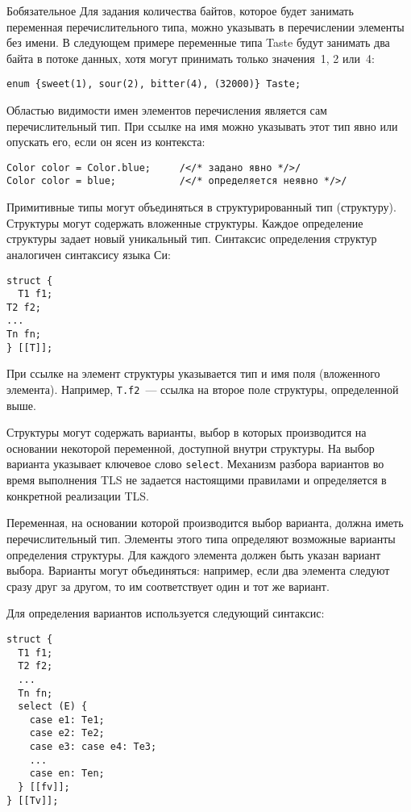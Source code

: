 \begin{appendix}{Б}{обязательное}
Для задания количества байтов, которое будет занимать переменная 
перечислительного типа, можно указывать в перечислении элементы без имени. 
В следующем примере переменные типа Taste будут занимать два байта в 
потоке данных, хотя могут принимать только значения~1, 2 или~4:  
\begin{lstlisting}
enum {sweet(1), sour(2), bitter(4), (32000)} Taste;
\end{lstlisting}

Областью видимости имен элементов перечисления является сам 
перечислительный тип. При ссылке на имя можно указывать этот тип явно или 
опускать его, если он ясен из контекста: 
\begin{lstlisting}
Color color = Color.blue;     /</* задано явно */>/    
Color color = blue;           /</* определяется неявно */>/ 
\end{lstlisting}

\label{SYNTAX.6}

Примитивные типы могут объединяться в структурированный тип (структуру). 
Структуры могут содержать вложенные структуры. Каждое определение 
структуры задает новый уникальный тип. Синтаксис определения структур 
аналогичен синтаксису языка Си: 
\begin{lstlisting}
struct {
  T1 f1;
T2 f2;
...
Tn fn;
} [[T]];
\end{lstlisting}

При ссылке на элемент структуры указывается тип и имя поля (вложенного 
элемента). Например, \lstinline{T.f2}~--- ссылка на второе поле структуры, 
определенной выше. 

Структуры могут содержать варианты, выбор в которых производится на 
основании некоторой переменной, доступной внутри структуры. На выбор 
варианта указывает ключевое слово \lstinline{select}. Механизм разбора 
вариантов во время выполнения TLS не задается настоящими правилами и 
определяется в конкретной реализации TLS.  
 
Переменная, на основании которой производится выбор варианта, должна иметь 
перечислительный тип. Элементы этого типа определяют возможные варианты 
определения структуры. Для каждого элемента должен быть указан вариант 
выбора. Варианты могут объединяться: например, если два элемента следуют 
сразу друг за другом, то им соответствует один и тот же вариант.  

Для определения вариантов используется следующий синтаксис:
\begin{lstlisting}
struct {
  T1 f1;
  T2 f2;
  ...
  Tn fn;
  select (E) {
    case e1: Te1;
    case e2: Te2;
    case e3: case e4: Te3;
    ...
    case en: Ten;
  } [[fv]];
} [[Tv]];
\end{lstlisting}


\end{appendix}
